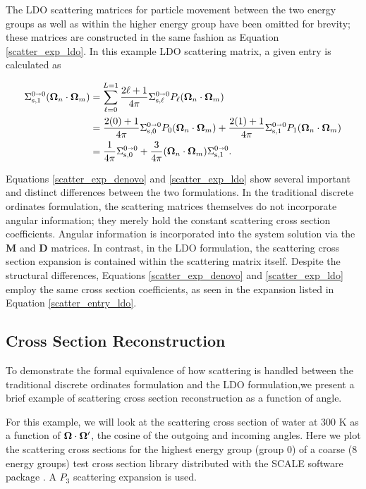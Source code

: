 \noindent The LDO scattering matrices for particle movement between the two energy 
groups as well as within the higher energy group have been omitted for brevity; these 
matrices are constructed in the same fashion as Equation \ref{scatter_exp_ldo}. In this
example LDO scattering matrix, a given entry is calculated as

\begin{align}
\Sigma^{0\shortrightarrow 0}_{\text{s,1}}(\mathbf\Omega_n \cdot \mathbf\Omega_m) &= \sum_{\ell=0}^{L=1}\frac{2\ell +1}{4\pi}
\Sigma^{0\shortrightarrow0}_{\text{s,$\ell$}}P_{\ell}(\mathbf\Omega_n\cdot\mathbf\Omega_m) \nonumber \\
&= \frac{2(0) + 1}{4\pi}\Sigma^{0\shortrightarrow0}_{\text{s,0}}P_{0}(\mathbf\Omega_n\cdot\mathbf\Omega_m) +
   \frac{2(1) + 1}{4\pi}\Sigma^{0\shortrightarrow0}_{\text{s,1}}P_{1}(\mathbf\Omega_n\cdot\mathbf\Omega_m)
   \label{scatter_entry_ldo} \\
&= \frac{1}{4\pi}\Sigma^{0\shortrightarrow0}_{\text{s,0}} +
   \frac{3}{4\pi}(\mathbf\Omega_n\cdot\mathbf\Omega_m)\Sigma^{0\shortrightarrow0}_{\text{s,1}}. \nonumber
\end{align}

Equations \ref{scatter_exp_denovo} and \ref{scatter_exp_ldo} show several
important and distinct differences between the two formulations. In the traditional
discrete ordinates formulation, the scattering matrices themselves do not incorporate
angular information; they merely hold the constant scattering cross section 
coefficients. Angular information is incorporated into the system solution via the 
$\mathbf{M}$ and $\mathbf{D}$ matrices. In contrast, in the LDO formulation, the
scattering cross section expansion is contained within the scattering matrix itself.
Despite the structural differences, Equations \ref{scatter_exp_denovo} and
\ref{scatter_exp_ldo} employ the same cross section coefficients, as seen in the
expansion listed in Equation \ref{scatter_entry_ldo}.

\subsection{Cross Section Reconstruction}

To demonstrate the formal equivalence of how scattering is handled between the
traditional discrete ordinates formulation and the LDO formulation,we present a brief 
example of scattering cross section reconstruction as a function of angle.

For this example, we will look at the scattering cross section of water at 300 K as a
function of $\mathbf\Omega\cdot\mathbf\Omega'$, the cosine of the outgoing and incoming angles. Here we
plot the scattering cross sections for the highest energy 
group (group 0) of a coarse (8 energy groups) test cross section library distributed 
with the SCALE software package \cite{scale}. A $P_3$ scattering expansion is used.

